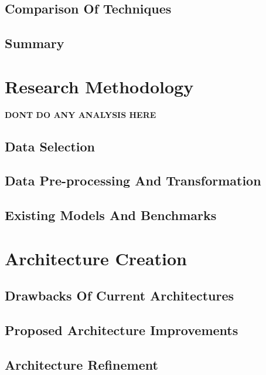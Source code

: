 \documentclass[12pt]{report}
\begin{document}
        \section{Comparison Of Techniques}\label{24}
        \section{Summary}\label{25}
        \citep{RAM}

    \chapter{\centering Research Methodology}\label{c3}
    \textbf{DONT DO ANY ANALYSIS HERE}
    \section{Data Selection}\label{c31}
    \section{Data Pre-processing And Transformation}\label{c32}
    \section{Existing Models And Benchmarks}\label{c33}
    \chapter{\centering Architecture Creation}\label{c4}
    \section{Drawbacks Of Current Architectures}\label{c41}
    \section{Proposed Architecture Improvements}\label{c42}
    \section{Architecture Refinement}\label{c43}
    \begin{appendices}
    \end{appendices}

\end{document}
